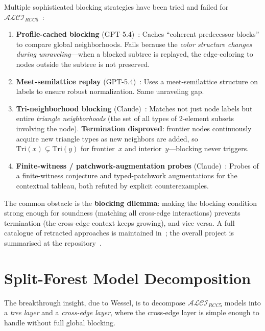 \documentclass[
]{ceurart}
\theoremstyle{definition}
\newcommand{\ALCIRCC}[1]{\ensuremath{\mathcal{ALCI}_{\mathit{RCC#1}}}}
\begin{document}
Multiple sophisticated blocking strategies have been tried and
failed for $\ALCIRCC{5}$~\cite{ALCIRCC5Outdated,StatusAfterFW,ResponseGPTBlocking}:
\begin{enumerate}
  \item \textbf{Profile-cached blocking} (GPT-5.4)~\cite{ResponseGPTBlocking}: Caches
    ``coherent predecessor blocks'' to compare global neighborhoods.
    Fails because the \emph{color structure changes during
    unraveling}---when a blocked subtree is replayed, the
    edge-coloring to nodes outside the subtree is not preserved.
  \item \textbf{Meet-semilattice replay} (GPT-5.4)~\cite{ResponseGPTBlocking}: Uses a
    meet-semilattice structure on labels to ensure robust
    normalization.  Same unraveling gap.
  \item \textbf{Tri-neighborhood blocking} (Claude)~\cite{TriangleBlocking}: Matches not
    just node labels but entire \emph{triangle neighborhoods}
    (the set of all types of 2-element subsets involving the node).
    \textbf{Termination disproved}: frontier nodes continuously
    acquire new triangle types as new neighbors are added, so
    $\mathrm{Tri}(x) \subsetneq \mathrm{Tri}(y)$ for frontier~$x$
    and interior~$y$---blocking never triggers.
  \item \textbf{Finite-witness / patchwork-augmentation probes}
    (Claude)~\cite{FWProof,PatchworkAugmentation,TypedPatchworkCounterexample}:
    Probes of a finite-witness conjecture and typed-patchwork
    augmentations for the contextual tableau, both refuted by
    explicit counterexamples.
\end{enumerate}

The common obstacle is the \textbf{blocking dilemma}: making the
blocking condition strong enough for soundness (matching all
cross-edge interactions) prevents termination (the cross-edge
context keeps growing), and vice versa.  A full catalogue of
retracted approaches is maintained
in~\cite{ALCIRCC5Outdated}; the overall project is summarised at
the repository~\cite{ALCIRCC5Repo}.

\section{Split-Forest Model Decomposition}
\label{sec:split-forest}

The breakthrough insight, due to Wessel, is to decompose
$\ALCIRCC{5}$ models into a \emph{tree layer} and a
\emph{cross-edge layer}, where the cross-edge layer is simple
enough to handle without full global blocking.
\end{document}
